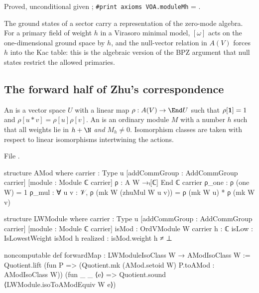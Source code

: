 \begin{status}
Proved, unconditional given ; \texttt{\#print axioms VOA.moduleMh} = .
\end{status}

\begin{physics}
The ground states of a sector carry a representation of the zero-mode algebra. For a primary field of weight $h$
in a Virasoro minimal model, $[\omega]$ acts on the one-dimensional ground space by $h$, and the null-vector
relation in $A(V)$ forces $h$ into the Kac table: this is the algebraic version of the BPZ argument that null
states restrict the allowed primaries.
\end{physics}

\subsection{The forward half of Zhu's correspondence}

\begin{definition}\label{l12:def:lwmodule}
An  is a vector space $U$ with a linear map $\rho:A(V)\to\End U$ such that $\rho[\mathbf{1}] = 1$ and
$\rho[u*v] = \rho[u]\rho[v]$. An  is an ordinary module $M$ with a number $h$ such that all weights lie
in $h+\N$ \emph{and} $M_h\neq0$. Isomorphism classes are taken with respect to linear isomorphisms intertwining
the actions.
\end{definition}
\noindent File .
\begin{leancode}
structure AMod where
  carrier : Type u
  [addCommGroup : AddCommGroup carrier]
  [module : Module ℂ carrier]
  ρ : A W →ₗ[ℂ] End ℂ carrier
  ρ_one : ρ (one W) = 1
  ρ_mul : ∀ u v : 𝒱, ρ (mk W (zhuMul W u v)) = ρ (mk W u) * ρ (mk W v)

structure LWModule where
  carrier : Type u
  [addCommGroup : AddCommGroup carrier]
  [module : Module ℂ carrier]
  isMod : OrdVModule W carrier
  h : ℂ
  isLow : IsLowestWeight isMod h
  realized : isMod.weight h ≠ ⊥

noncomputable def forwardMap : LWModuleIsoClass W → AModIsoClass W :=
  Quotient.lift (fun P => (Quotient.mk (AMod.setoid W) P.toAMod : AModIsoClass W))
    (fun _ _ ⟨e⟩ => Quotient.sound ⟨LWModule.isoToAModEquiv W e⟩)
\end{leancode}

